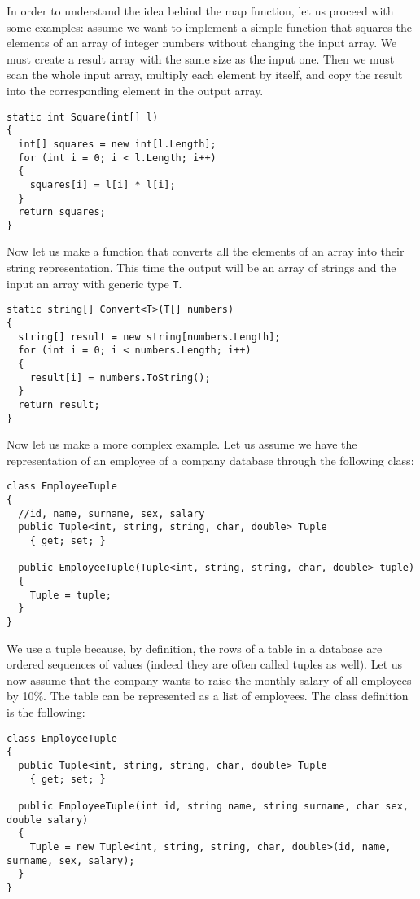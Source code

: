 In order to understand the idea behind the map function, let us proceed with some examples: assume we want to implement a simple function that squares the elements of an array of integer numbers without changing the input array. We must create a result array with the same size as the input one. Then we must scan the whole input array, multiply each element by itself, and copy the result into the corresponding element in the output array.

\begin{lstlisting}
static int Square(int[] l)
{
  int[] squares = new int[l.Length];
  for (int i = 0; i < l.Length; i++)
  {
    squares[i] = l[i] * l[i];
  }
  return squares;
}
\end{lstlisting}

Now let us make a function that converts all the elements of an array into their string representation. This time the output will be an array of strings and the input an array with generic type \texttt{T}.

\begin{lstlisting}
static string[] Convert<T>(T[] numbers)
{
  string[] result = new string[numbers.Length];
  for (int i = 0; i < numbers.Length; i++)
  {
    result[i] = numbers.ToString();
  }
  return result;
}
\end{lstlisting}

Now let us make a more complex example. Let us assume we have the representation of an employee of a company database through the following class:

\begin{lstlisting}
class EmployeeTuple
{
  //id, name, surname, sex, salary
  public Tuple<int, string, string, char, double> Tuple 
    { get; set; }

  public EmployeeTuple(Tuple<int, string, string, char, double> tuple)
  {
    Tuple = tuple;
  }
}
\end{lstlisting}

We use a tuple because, by definition, the rows of a table in a database are ordered sequences of values (indeed they are often called tuples as well). Let us now assume that the company wants to raise the monthly salary of all employees by 10\%. The table can be represented as a list of employees. The class definition is the following:

\begin{lstlisting}
class EmployeeTuple
{
  public Tuple<int, string, string, char, double> Tuple 
    { get; set; }

  public EmployeeTuple(int id, string name, string surname, char sex, double salary)
  {
    Tuple = new Tuple<int, string, string, char, double>(id, name, surname, sex, salary);
  }
}
\end{lstlisting}

